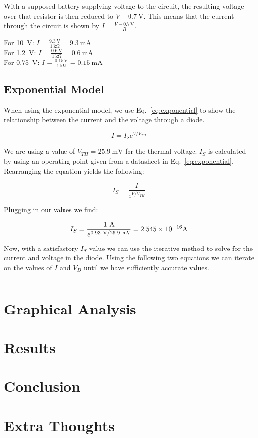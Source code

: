 \documentclass{../../ece-report}
\begin{document}
With a supposed battery supplying voltage to the circuit,
the resulting voltage over that resistor is then reduced
to $V - 0.7~\si{\V}$. This means that the current through the circuit
is shown by $I = \frac{V - 0.7~\si{\V}}{R}$.

For 10~V: $I=\frac{9.3~\si{\V}}{1~\si{\kohm}} = 9.3~\si{\mA}$ \\
For 1.2~V: $I=\frac{0.6~\si{\V}}{1~\si{\kohm}} = 0.6~\si{\mA}$ \\
For 0.75~V: $I=\frac{0.15~\si{\V}}{1~\si{\kohm}} = 0.15~\si{\mA}$

\subsection{Exponential Model}

When using the exponential model, we use Eq.~\ref{eq:exponential}
to show the relationship between the current and the
voltage through a diode.

\begin{equation}
  \label{eq:exponential}
  I = I_S e ^ {V / V_{TH}}
\end{equation}

We are using a value of $V_{TH}=25.9~\si{\mV}$ for the
thermal voltage. $I_S$ is calculated by using an operating
point given from a datasheet in Eq.~\ref{eq:exponential}.
Rearranging the equation yields the following:

\[
  I_S = \frac{I}{e^{V/V_{TH}}}
\]

Plugging in our values we find:

\[
  I_S = \frac{1~\si{\A}}{e^{0.93~\si{\V}/25.9~\si{\mV}}} = \SI{2.545E-16}~\si{\A}
\]

Now, with a satisfactory $I_S$ value we can use the
iterative method to solve for the current and voltage
in the diode. Using the following two equations we can iterate on the values
of $I$ and $V_D$ until we have sufficiently accurate values.

\[
  
\]

\section{Graphical Analysis}

\section{Results}

\section{Conclusion}

\section{Extra Thoughts}
\end{document}
